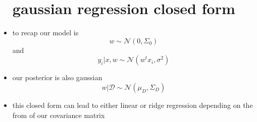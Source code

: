 \documentclass{article}
\begin{document}
\begin{itemize}
\section*{gaussian regression closed form }
\item to recap our model is $$w\sim \mathcal{N}(0,\Sigma_{0})$$ and $$y_i|x,w \sim \mathcal{N}(w^{t}x_i, \sigma^{2})$$
\item our posterior is also gaussian $$w|\mathcal{D}\sim \mathcal{N}(\mu_{D}, \Sigma_{D})$$
\item this closed form can lead to either linear or ridge regression depending on the from of our covariance matrix  
\end{itemize} 
\end{document}
